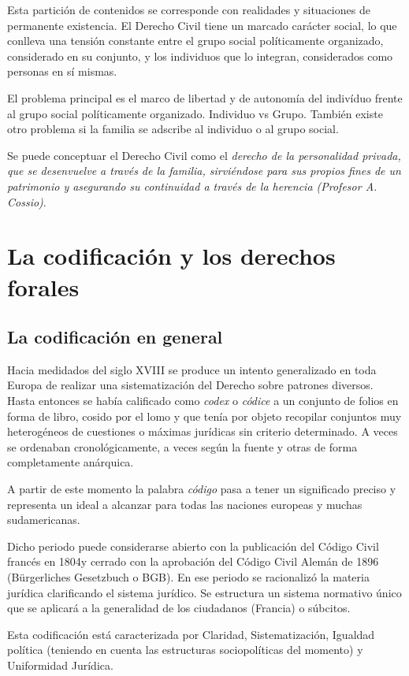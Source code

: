\documentclass[a4paper,12pt]{report}
\begin{document}
Esta partición de contenidos se corresponde con realidades y situaciones de
permanente existencia. El Derecho Civil tiene un marcado carácter social, lo que
conlleva una tensión constante entre el grupo social políticamente organizado,
considerado en su conjunto, y los individuos que lo integran, considerados como
personas en sí mismas.

El problema principal es el marco de libertad y de autonomía del indivíduo
frente al grupo social políticamente organizado. Individuo vs Grupo. También
existe otro problema si la familia se adscribe al individuo o al grupo social.

Se puede conceptuar el Derecho Civil como el \textit{derecho de la personalidad
privada, que se desenvuelve a través de la familia, sirviéndose para sus propios
fines de un patrimonio y asegurando su continuidad a través de la herencia
(Profesor A. Cossio)}.

\section{La codificación y los derechos forales}
\subsection{La codificación en general}

Hacia medidados del siglo XVIII se produce un intento generalizado en toda
Europa de realizar una sistematización del Derecho sobre patrones diversos.
Hasta entonces se había calificado como \emph{codex} o \emph{códice} a un
conjunto de folios en forma de libro, cosido por el lomo y que tenía por objeto
recopilar conjuntos muy heterogéneos de cuestiones o máximas jurídicas sin
criterio determinado. A veces se ordenaban cronológicamente, a veces según la
fuente y otras de forma completamente anárquica.

A partir de este momento la palabra \emph{código} pasa a tener un significado
preciso y representa un ideal a alcanzar para todas las naciones europeas y
muchas sudamericanas.

Dicho periodo puede considerarse abierto con la publicación del Código Civil
francés en 1804y cerrado con la aprobación del Código Civil Alemán de 1896
(Bürgerliches Gesetzbuch o BGB). En ese periodo se racionalizó la materia
jurídica clarificando el sistema jurídico. Se estructura un sistema normativo
único que se aplicará a la generalidad de los ciudadanos (Francia) o súbcitos.

Esta codificación está caracterizada por Claridad, Sistematización, Igualdad
política (teniendo en cuenta las estructuras sociopolíticas del momento) y
Uniformidad Jurídica.
\end{document}
